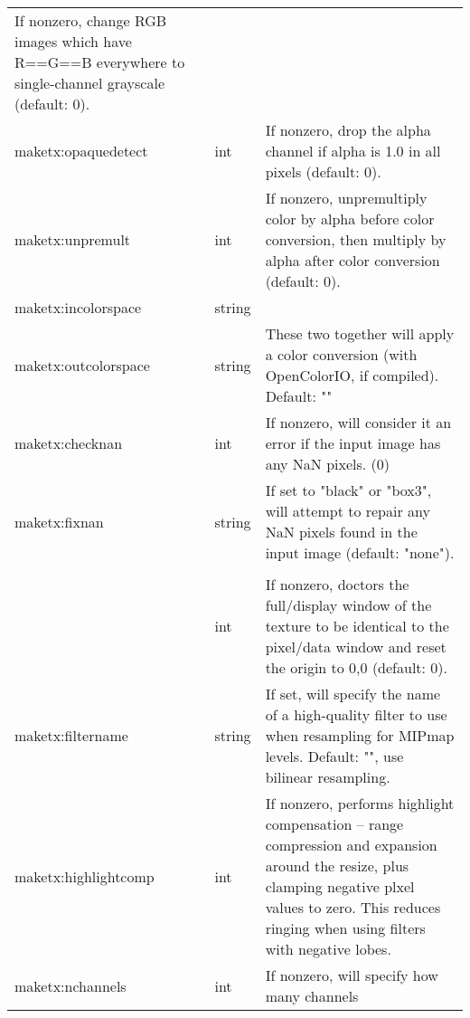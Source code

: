 \begin{longtable}{ >{\spc \cf\small}p{1.8in} >{\cf\small}l p{3in}}
                          If nonzero, change RGB images which have
                             R==G==B everywhere to single-channel
                             grayscale (default: 0). \\
   maketx:opaquedetect & int &
                          If nonzero, drop the alpha channel if alpha
                             is 1.0 in all pixels (default: 0). \\
   maketx:unpremult & int &  If nonzero, unpremultiply color by alpha before
                             color conversion, then multiply by alpha
                             after color conversion (default: 0). \\
   {\small maketx:incolorspace} & string & \\
   {\small maketx:outcolorspace} & string &
                          These two together will apply a color conversion
                              (with OpenColorIO, if compiled). Default: "" \\
   maketx:checknan & int &   If nonzero, will consider it an error if the
                              input image has any NaN pixels. (0) \\
   maketx:fixnan & string & If set to "black" or "box3", will attempt
                              to repair any NaN pixels found in the
                              input image (default: "none"). \\
   \multicolumn{2}{l}{\spc \cf\small maketx:set_full_to_pixels} \\ & int &
                          If nonzero, doctors the full/display window
                              of the texture to be identical to the
                              pixel/data window and reset the origin
                              to 0,0 (default: 0). \\
   maketx:filtername & string &
                          If set, will specify the name of a high-quality
                             filter to use when resampling for MIPmap
                             levels. Default: "", use bilinear resampling. \\
   maketx:highlightcomp & int &
                          If nonzero, performs highlight compensation --
                             range compression and expansion around 
                             the resize, plus clamping negative plxel
                             values to zero. This reduces ringing when
                             using filters with negative lobes. \\
   maketx:nchannels & int &  If nonzero, will specify how many channels

\end{longtable}
